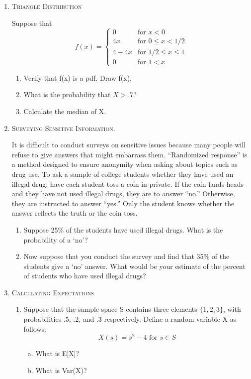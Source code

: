 \documentclass[11pt,letterpaper]{article}
\numberwithin{equation}{section}
\begin{document}
\begin{enumerate}[I]
\item \textsc{Triangle Distribution} 

Suppose that 
$$f(x)=\begin{cases} 0 & \text{for } x< 0\\ 4x & \text{for } 0\leq x < 1/2 \\ 4-4x  & \text{for }  1/2 \leq x\leq 1\\ 0 &\text{for } 1<x
\end{cases}$$
\begin{enumerate}[1)]
\item  Verify that f(x) is a pdf.  Draw f(x).
\item What is the probability that $X > .7$?
\item Calculate the median of X.
\end{enumerate}
\item \textsc{Surveying Sensitive Information.}

  It is difficult to conduct surveys on sensitive issues because many people will refuse to give answers that might embarrass them. ``Randomized response'' is a method designed to ensure anonymity when asking about topics such as drug use. To ask a sample of college students whether they have used an illegal drug, have each student toss a coin in private. If the coin lands heads and they have not used illegal drugs, they are to answer ``no.'' Otherwise, they are instructed to answer ``yes.'' Only the student knows whether the answer reflects the truth or the coin toss.

\begin{enumerate}[1)]
\item Suppose 25\% of the students have used illegal drugs. What is the probability of a `no'? 
\item  Now suppose that you conduct the survey and find that 35\% of the students give a `no' answer. What would be your estimate of the percent of students who have used illegal drugs?
\end{enumerate}
\pagebreak
\item \textsc{Calculating Expectations}
\begin{enumerate}[1)]
\item Suppose that the sample space S contains three elements $\{1, 2, 3\}$, with probabilities .5, .2, and .3 respectively.  Define a random variable X as follows:
$$X(s) = s^2 - 4 \text{ for } s \in S$$ 
\begin{enumerate}[a)]
\item What is E[X]? 
\item What is Var(X)?
\end{enumerate}


\end{enumerate}
\end{enumerate}
\end{document}
